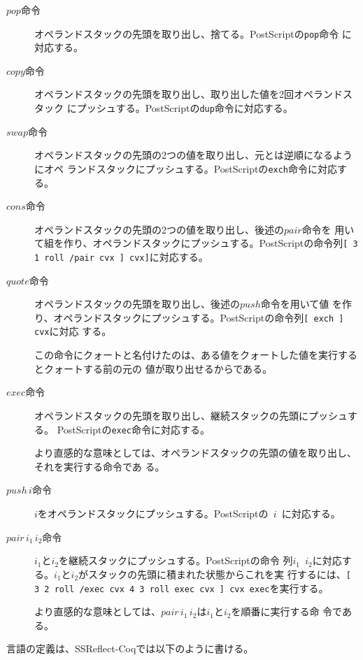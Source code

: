\documentclass[a4paper, 10pt, twocolumn, titlepage]{ujarticle}
\renewcommand{\{}{\symbol{"7B}}
\renewcommand{\}}{\symbol{"7D}}
\begin{document}
\begin{description}
 \item[$\mathit{pop}$命令] オペランドスタックの先頭を取り出し、捨てる。PostScriptの\texttt{pop}命令
	    に対応する。
 \item[$\mathit{copy}$命令] オペランドスタックの先頭を取り出し、取り出した値を2回オペランドスタック
	    にプッシュする。PostScriptの\texttt{dup}命令に対応する。
 \item[$\mathit{swap}$命令] オペランドスタックの先頭の2つの値を取り出し、元とは逆順になるようにオペ
	    ランドスタックにプッシュする。PostScriptの\texttt{exch}命令に対応する。
 \item[$\mathit{cons}$命令] オペランドスタックの先頭の2つの値を取り出し、後述の$\mathit{pair}$命令を
	    用いて組を作り、オペランドスタックにプッシュする。PostScriptの命令列\texttt{[ 3 1 roll
	    /pair cvx ] cvx]}に対応する。
 \item[$\mathit{quote}$命令] オペランドスタックの先頭を取り出し、後述の$\mathit{push}$命令を用いて値
	    を作り、オペランドスタックにプッシュする。PostScriptの命令列\texttt{[ exch ] cvx}に対応
	    する。

	    この命令にクォートと名付けたのは、ある値をクォートした値を実行するとクォートする前の元の
	    値が取り出せるからである。
 \item[$\mathit{exec}$命令] オペランドスタックの先頭を取り出し、継続スタックの先頭にプッシュする。
	    PostScriptの\texttt{exec}命令に対応する。

	    より直感的な意味としては、オペランドスタックの先頭の値を取り出し、それを実行する命令であ
	    る。
 \item[$\mathit{push} \, i$命令] $i$をオペランドスタックにプッシュする。PostScriptの\texttt{\{ $i$
	    \}}に対応する。
 \item[$\mathit{pair} \, i_1 \, i_2$命令] $i_1$と$i_2$を継続スタックにプッシュする。PostScriptの命令
	    列\texttt{$i_1$ $i_2$}に対応する。$i_1$と$i_2$がスタックの先頭に積まれた状態からこれを実
	    行するには、\texttt{[ 3 2 roll /exec cvx 4 3 roll exec cvx ] cvx exec}を実行する。

	    より直感的な意味としては、$\mathit{pair} \, i_1 \, i_2$は$i_1$と$i_2$を順番に実行する命
	    令である。
\end{description}

言語の定義は、SSReflect-Coqでは以下のように書ける。
\end{document}
